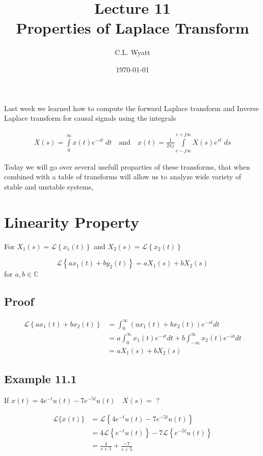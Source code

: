 \documentclass{article}
\begin{document}
\title{Lecture 11\\ Properties of Laplace Transform}
\author{C.L. Wyatt}
\date{\today}
\maketitle

Last week we learned how to compute the forward Laplace transform and Inverse Laplace transform for causal signals using the integrals


$$
\begin{aligned}
X(s)=\int\limits_{0}^{\infty} x(t) e^{-s t}\; dt \quad\text{and}\quad x(t)=\frac{1}{2 \pi j} \int\limits_{c- j \infty}^{c+j \infty} X(s) e^{s t}\; ds
\end{aligned}
$$

Today we will go over several usefull proparties of these transforms, that when combined with a table of transforms will allow us to analyze wide variety of stable and unstable systems,

\section{Linearity Property}

For $X_{1}(s)=\mathcal{L}\left\{x_{1}(t)\right\}$ and $X_{2}(s)=\mathcal{L}\left\{x_{2}(t)\right\}$

$$
\mathcal{L}\left\{a x_{1}(t)+b y_{2}(t)\right\}=a X_{1}(s)+b X_{2}(s)
$$
for $a, b \in \mathbb{C}$

\subsection{Proof}

$$
\begin{aligned}
\mathcal{L}\left\{a x_{1}(t)+b x_{2}(t)\right\} & =\int_{0}^{\infty}\left(a x_{1}(t)+b x_{2}(t)\right) e^{-s t} d t \\
& =a \int_{0}^{\infty} x_{1}(t) e^{-s t} d t+b \int_{-\infty}^{\infty} x_{2}(t) e^{-s t} d t \\
& =a X_{1}(s)+b X_{2}(s)
\end{aligned}
$$

\subsection{Example 11.1}
If $x(t)=4 e^{-t} u(t)-7 e^{-5 t} u(t) \quad X(s)=$ ?

$$
\begin{aligned}
\mathcal{L}\{x(t)\} & =\mathcal{L}\left\{4 e^{-t} u(t)-7 e^{-5 t} u(t)\right\} \\
& =4 \mathcal{L}\left\{e^{-t} u(t)\right\}-7\mathcal{L}\left\{e^{-5 t} u(t)\right\} \\
& =\frac{4}{s+1}+\frac{-7}{s+5}
\end{aligned}
$$
\end{document}
